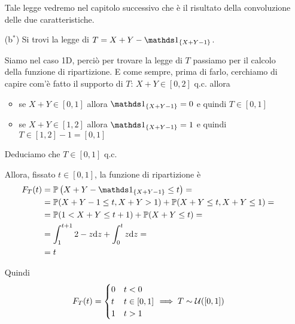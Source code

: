\begin{enumerate}

\begin{oss} Tale legge vedremo nel capitolo successivo che è il risultato della convoluzione delle due caratteristiche. \end{oss}

\item [(b$^*$)] Si trovi la legge di $T=X+Y-\Ind_{\{ X+Y-1 \}}$.

Siamo nel caso 1D, perciò per trovare la legge di $T$ passiamo per il calcolo della funzione di ripartizione. E come sempre, prima di farlo, cerchiamo di capire com'è fatto il supporto di $T$: $X+Y\in[0,2]$ q.c. allora
\begin{itemize}
\item se $X+Y\in[0,1]$ allora $\Ind_{\{ X+Y-1 \}}=0$ e quindi $T\in[0,1]$
\item se $X+Y\in[1,2]$ allora $\Ind_{\{ X+Y-1 \}}=1$ e quindi $T\in[1,2]-1=[0,1]$
\end{itemize}
Deduciamo che $T\in[0,1]$ q.c.

Allora, fissato $t\in[0,1]$, la funzione di ripartizione è
\begin{gather*}
\begin{aligned}
F_T(t)&=\PP\left(X+Y-\Ind_{\{ X+Y-1 \}}\leq t  \right)=\\
&=\PP(X+Y-1\leq t,X+Y>1)+\PP(X+Y\leq t,X+Y\leq 1)=\\
&=\PP(1<X+Y\leq t+1)+\PP(X+Y\leq t)=\\
&=\int_1^{t+1}2-z\dz+\int_0^tz\dz=\\
&=t
\end{aligned}
\end{gather*}

Quindi
\[
F_T(t)=
\begin{cases}
0 &t<0 \\
t &t\in[0,1] \\
1 &t>1
\end{cases}
\implies T\sim\mathcal{U}([0,1])
\]

\end{enumerate}

